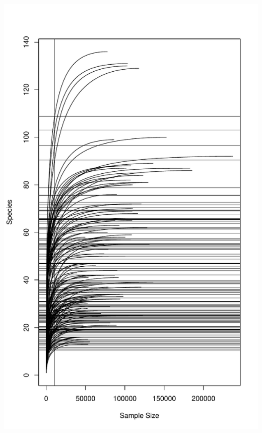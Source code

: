 \documentclass[
]{article}
\begin{document}
\includegraphics[width=1\linewidth]{manuscript_template_files/figure-latex/unnamed-chunk-20-1}
\end{document}

